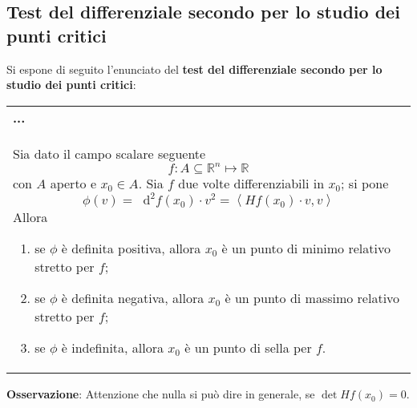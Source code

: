 \documentclass[a4paper]{extarticle}
\renewcommand\arraystretch{}
\newcommand*\dif{\mathop{}\!\mathrm{d}}
\begin{document}
\vspace{1em}
\noindent
\subsection{Test del differenziale secondo per lo studio dei punti critici}
Si espone di seguito l'enunciato del \textbf{test del differenziale secondo per lo studio dei punti critici}:

\vspace{1em}
\setlength{\tabcolsep}{14pt}
\renewcommand{\arraystretch}{2}
\noindent
\begin{tabularx}{\textwidth}{@{}|P|@{}}
    \hline
    {\textbf{...}}\\
    \parbox{\linewidth}{Sia dato il campo scalare seguente
    \[f : A \subseteq \mathbb{R}^n \longmapsto \mathbb{R}\]
    con $A$ aperto e $x_0 \in A$. Sia $f$ due volte differenziabili in $x_0$; si pone
    \[\phi(v) = \dif^2 f(x_0) \cdot v^2 = \left<H f(x_0) \cdot v, v\right>\]
    Allora
    \begin{enumerate}
        \item se $\phi$ è definita positiva, allora $x_0$ è un punto di minimo relativo stretto per $f$;
        \item se $\phi$ è definita negativa, allora $x_0$ è un punto di massimo relativo stretto per $f$;
        \item se $\phi$ è indefinita, allora $x_0$ è un punto di sella per $f$.
    \end{enumerate}
    \vspace{1mm}}\\
    \hline
\end{tabularx}

\vspace{2em}
\noindent
\textbf{Osservazione}: Attenzione che nulla si può dire in generale, se $\det H f(x_0) = 0$.
\end{document}
